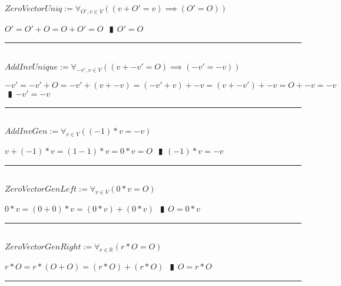 \documentclass{book}
\newcommand{\abr}{:=}
\newcommand{\pipe}{$\phantom{(}\vrectangleblack\phantom{)}$}
\newcommand{\pr}[1]{\left(#1\right)}
\begin{document}
$ZeroVectorUniq \abr \forall_{O', v \in V}\pr{(v + O' = v) \implies (O' = O)}$
\begin{enumerate}
  \lit $O' = O' + O = O + O' = O$ \pipe $O' = O$
\end{enumerate} \vspace{.75mm} \hrule \vspace{.75mm} \ \\ 

$AddInvUnique \abr \forall_{-v', v \in V}\pr{(v + -v' = O) \implies (-v' = -v)}$
\begin{enumerate}
  \lit $-v' = -v' + O = -v' + (v + -v) = (-v' + v) + -v = (v + -v') + -v = O + -v = -v$ \pipe $-v' = -v$
\end{enumerate} \vspace{.75mm} \hrule \vspace{.75mm} \ \\ 

$AddInvGen \abr \forall_{v \in V}\pr{(-1) * v = -v}$
\begin{enumerate}
  \lit $v + (-1) * v = (1 - 1) * v = 0 * v = O$ \pipe $(-1) * v = -v$
\end{enumerate} \vspace{.75mm} \hrule \vspace{.75mm} \ \\ 

$ZeroVectorGenLeft \abr \forall_{v \in V}(0 * v = O)$
\begin{enumerate}
  \lit $0 * v = (0 + 0) * v = (0 * v) + (0 * v)$ \pipe $O = 0 * v$
\end{enumerate} \vspace{.75mm} \hrule \vspace{.75mm} \ \\ 

$ZeroVectorGenRight \abr \forall_{r \in \mathbb{R}}(r * O = O)$
\begin{enumerate}
  \lit $r * O = r * (O + O) = (r * O) + (r * O)$ \pipe $O = r * O$
\end{enumerate} \vspace{.75mm} \hrule \vspace{.75mm} \ \\ 
\end{document}
